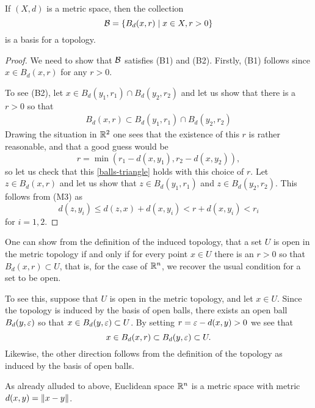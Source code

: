 \begin{prop}
  \label{metric-basis}
  If $(X,d)$ is a metric space, then the collection
  \[
    \mathcal{B} = \{ B_d(x,r) \mid x \in X, r > 0\}
  \]
  is a basis for a topology.
\end{prop}
\begin{proof}
  We need to show that $\mathcal{B}$ satisfies (B1) and (B2). Firstly, (B1) follows since $x \in B_d(x,r)$ for any $r > 0$.
  
  To see (B2), let $x \in B_d(y_1,r_1) \cap B_d(y_2,r_2)$ and let us show that there is a $r > 0$ so that
  \begin{align}
    \label{balls-triangle}
    B_d(x,r) \subset B_d(y_1,r_1) \cap B_d(y_2,r_2)
  \end{align}
  Drawing the situation in $\mathbb{R}^2$ one sees that the existence of this $r$ is rather reasonable, and that a good guess would be
  \[
    r = \min(r_1 - d(x,y_1) , r_2 - d(x,y_2)),
  \]
  so let us check that this \eqref{balls-triangle} holds with this choice of $r$. Let $z \in B_d(x,r)$ and let us show that $z \in B_d(y_1,r_1)$ and $z \in B_d(y_2,r_2)$. This follows from (M3) as
  \[
    d(z,y_i) \leq d(z,x) + d(x,y_i) < r + d(x,y_i) < r_i
  \]
  for $i = 1,2$.
\end{proof}
\begin{rem}
  \label{remark-def-open-balls}
  One can show from the definition of the induced topology, that a set $U$ is open in the metric topology if and only if for every point $x \in U$ there is an $r > 0$ so that $B_d(x,r) \subset U$, that is, for the case of $\mathbb{R}^n$, we recover the usual condition for a set to be open.
  
  To see this, suppose that $U$ is open in the metric topology, and let $x \in U$. Since the topology is induced by the basis of open balls, there exists an open ball $B_d(y,\varepsilon)$ so that $x \in B_d(y,\varepsilon) \subset U$. By setting $r = \varepsilon - d(x,y) > 0$ we see that
  \[
    x \in B_d(x,r) \subset B_d(y,\varepsilon) \subset U.
  \]
  Likewise, the other direction follows from the definition of the topology as induced by the basis of open balls.
\end{rem}
\begin{example}
  As already alluded to above, Euclidean space $\mathbb{R}^n$ is a metric space with metric $d(x,y) = \lVert x-y \rVert$.
\end{example}
